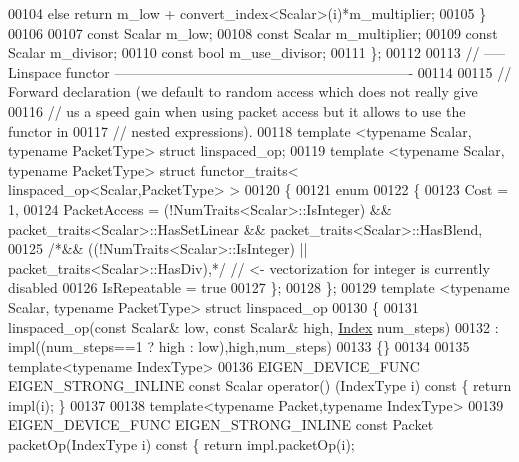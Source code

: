 \begin{DoxyCode}
00104     \textcolor{keywordflow}{else}              \textcolor{keywordflow}{return} m\_low + convert\_index<Scalar>(i)*m\_multiplier;
00105   \}
00106 
00107   \textcolor{keyword}{const} Scalar m\_low;
00108   \textcolor{keyword}{const} Scalar m\_multiplier;
00109   \textcolor{keyword}{const} Scalar m\_divisor;
00110   \textcolor{keyword}{const} \textcolor{keywordtype}{bool} m\_use\_divisor;
00111 \};
00112 
00113 \textcolor{comment}{// ----- Linspace functor ----------------------------------------------------------------}
00114 
00115 \textcolor{comment}{// Forward declaration (we default to random access which does not really give}
00116 \textcolor{comment}{// us a speed gain when using packet access but it allows to use the functor in}
00117 \textcolor{comment}{// nested expressions).}
00118 \textcolor{keyword}{template} <\textcolor{keyword}{typename} Scalar, \textcolor{keyword}{typename} PacketType> \textcolor{keyword}{struct }linspaced\_op;
00119 \textcolor{keyword}{template} <\textcolor{keyword}{typename} Scalar, \textcolor{keyword}{typename} PacketType> \textcolor{keyword}{struct }functor\_traits< linspaced\_op<Scalar,PacketType> >
00120 \{
00121   \textcolor{keyword}{enum}
00122   \{
00123     Cost = 1,
00124     PacketAccess =   (!NumTraits<Scalar>::IsInteger) && packet\_traits<Scalar>::HasSetLinear && 
      packet\_traits<Scalar>::HasBlend,
00125                   \textcolor{comment}{/*&& ((!NumTraits<Scalar>::IsInteger) || packet\_traits<Scalar>::HasDiv),*/} \textcolor{comment}{// <-
       vectorization for integer is currently disabled}
00126     IsRepeatable = \textcolor{keyword}{true}
00127   \};
00128 \};
00129 \textcolor{keyword}{template} <\textcolor{keyword}{typename} Scalar, \textcolor{keyword}{typename} PacketType> \textcolor{keyword}{struct }linspaced\_op
00130 \{
00131   linspaced\_op(\textcolor{keyword}{const} Scalar& low, \textcolor{keyword}{const} Scalar& high, \hyperlink{namespace_eigen_a62e77e0933482dafde8fe197d9a2cfde}{Index} num\_steps)
00132     : impl((num\_steps==1 ? high : low),high,num\_steps)
00133   \{\}
00134 
00135   \textcolor{keyword}{template}<\textcolor{keyword}{typename} IndexType>
00136   EIGEN\_DEVICE\_FUNC EIGEN\_STRONG\_INLINE \textcolor{keyword}{const} Scalar operator() (IndexType i)\textcolor{keyword}{ const }\{ \textcolor{keywordflow}{return} impl(i); \}
00137 
00138   \textcolor{keyword}{template}<\textcolor{keyword}{typename} Packet,\textcolor{keyword}{typename} IndexType>
00139   EIGEN\_DEVICE\_FUNC EIGEN\_STRONG\_INLINE \textcolor{keyword}{const} Packet packetOp(IndexType i)\textcolor{keyword}{ const }\{ \textcolor{keywordflow}{return} impl.packetOp(i);

\end{DoxyCode}
